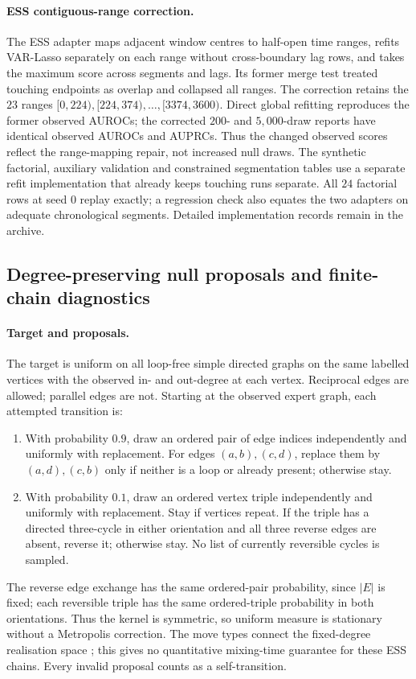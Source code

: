 \documentclass[11pt]{article}
\begin{document}
\paragraph{ESS contiguous-range correction.}
The ESS adapter maps adjacent window centres to half-open time ranges,
refits VAR-Lasso separately on each range without cross-boundary lag rows,
and takes the maximum score across segments and lags. Its former merge test
treated touching endpoints as overlap and collapsed all ranges. The correction
retains the $23$ ranges $[0,224),[224,374),\ldots,[3374,3600)$.
Direct global refitting reproduces the former observed AUROCs; the corrected
$200$- and $5{,}000$-draw reports have identical observed AUROCs and AUPRCs.
Thus the changed observed scores reflect the range-mapping repair, not increased
null draws. The synthetic factorial, auxiliary validation and constrained
segmentation tables use a separate refit implementation that already keeps
touching runs separate. All $24$ factorial rows at seed $0$ replay exactly;
a regression check also equates the two adapters on adequate chronological
segments. Detailed implementation records remain in the archive.

\subsection{Degree-preserving null proposals and finite-chain diagnostics}
\label{app:ess-null}

\paragraph{Target and proposals.}
The target is uniform on all loop-free simple directed graphs on the same
labelled vertices with the observed in- and out-degree at each vertex. Reciprocal
edges are allowed; parallel edges are not. Starting at the observed expert graph,
each attempted transition is:
\begin{enumerate}
\item With probability $0.9$, draw an ordered pair of edge indices independently
and uniformly with replacement. For edges $(a,b),(c,d)$, replace them by
$(a,d),(c,b)$ only if neither is a loop or already present; otherwise stay.
\item With probability $0.1$, draw an ordered vertex triple independently and
uniformly with replacement. Stay if vertices repeat. If the triple has a directed
three-cycle in either orientation and all three reverse edges are absent,
reverse it; otherwise stay. No list of currently reversible cycles is sampled.
\end{enumerate}
The reverse edge exchange has the same ordered-pair probability, since $|E|$
is fixed; each reversible triple has the same ordered-triple probability in
both orientations. Thus the kernel is symmetric, so uniform measure is
stationary without a Metropolis correction. The move types connect the fixed-degree
realisation space \citep{lamar2009uniform}; this gives no quantitative mixing-time
guarantee for these ESS chains. Every invalid proposal counts as a self-transition.
\end{document}
